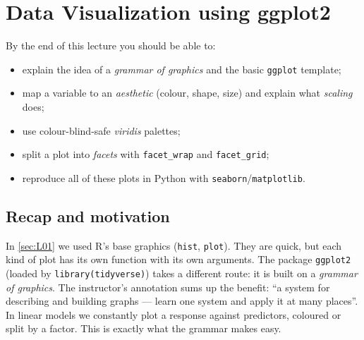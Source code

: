 \section{Data Visualization using ggplot2}\label{sec:L02}


\begin{guiding*}
By the end of this lecture you should be able to:
\begin{itemize}
  \item explain the idea of a \emph{grammar of graphics} and the basic \texttt{ggplot} template;
  \item map a variable to an \emph{aesthetic} (colour, shape, size) and explain what \emph{scaling} does;
  \item use colour-blind-safe \emph{viridis} palettes;
  \item split a plot into \emph{facets} with \texttt{facet\_wrap} and \texttt{facet\_grid};
  \item reproduce all of these plots in Python with \texttt{seaborn}/\texttt{matplotlib}.
\end{itemize}
\end{guiding*}

\subsection{Recap and motivation}
In \cref{sec:L01} we used R's base graphics (\texttt{hist}, \texttt{plot}). They are quick, but
each kind of plot has its own function with its own arguments. The package \texttt{ggplot2}
(loaded by \texttt{library(tidyverse)}) takes a different route: it is built on a \emph{grammar
of graphics}. The instructor's annotation sums up the benefit: ``a system for describing and
building graphs --- learn one system and apply it at many places''. In linear models we
constantly plot a response against predictors, coloured or split by a factor. This is exactly
what the grammar makes easy.

